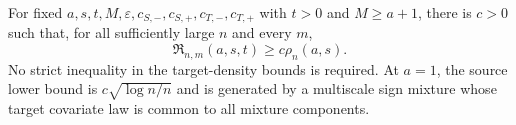 For fixed \(a,s,t,M,\varepsilon,c_{S,-},c_{S,+},c_{T,-},c_{T,+}\) with \(t>0\) and \(M\ge a+1\), there is \(c>0\) such that, for all sufficiently large \(n\) and every \(m\),
\[
\mathfrak R_{n,m}(a,s,t)\ge c\rho_n(a,s).
\]
No strict inequality in the target-density bounds is required. At \(a=1\), the source lower bound is \(c\sqrt{\log n/n}\) and is generated by a multiscale sign mixture whose target covariate law is common to all mixture components.